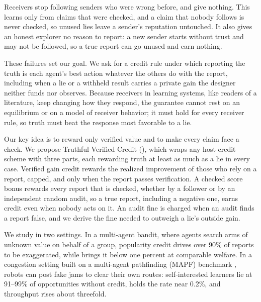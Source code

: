 Receivers stop following senders who were wrong before, and give nothing. This
learns only from claims that were checked, and a claim that nobody follows is
never checked, so unused lies leave a sender's reputation untouched. It also
gives an honest explorer no reason to report: a new sender starts without trust
and may not be followed, so a true report can go unused and earn nothing.

These failures set our goal. We ask for a credit rule under which reporting the
truth is each agent's best action whatever the others do with the report,
including when a lie or a withheld result carries a private gain the designer
neither funds nor observes. Because receivers in learning systems, like
readers of a literature, keep changing how they respond, the guarantee cannot
rest on an equilibrium or on a model of receiver behavior; it must hold for
every receiver rule, so truth must beat the response most favorable to a lie.

Our key idea is to reward only verified value and to make every claim face a
check. We propose Truthful Verified Credit (\tvc{}), which wraps any host credit
scheme with three parts, each rewarding truth at least as much as a lie in every
case. Verified gain credit rewards the realized improvement of those who rely on a
report, capped, and only when the report passes verification. A checked score
bonus rewards every report that is checked, whether by a follower or by an
independent random audit, so a true report, including a negative one, earns
credit even when nobody acts on it. An audit fine is charged when an audit finds
a report false, and we derive the fine needed to outweigh a lie's outside gain.

We study \tvc{} in two settings. In a multi-agent bandit, where agents search
arms of unknown value on behalf of a group, popularity credit drives over
90\% of reports to be exaggerated, while \tvc{} brings it below one percent at
comparable welfare. In a congestion setting built on a multi-agent pathfinding (MAPF)
benchmark \citep{skrynnik2025pogema}, robots can post fake jams to clear their
own routes: self-interested learners lie at 91--99\% of opportunities without
credit, \tvc{} holds the rate near 0.2\%, and throughput rises about threefold.

